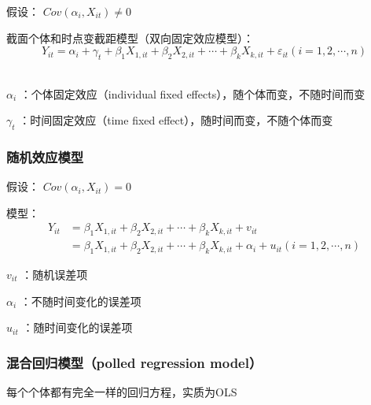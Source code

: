 \documentclass[12pt]{book}
\begin{document}
假设： $Cov(\alpha_i,X_{it})\neq0$

截面个体和时点变截距模型（双向固定效应模型）：
$$Y_{it} =\alpha_i+\gamma_t+\beta_1X_{1,it}+\beta_2X_{2,it}+\cdots+\beta_kX_{k,it}+\varepsilon_{it}\left(i=1,2,\cdots,n\right) $$ \\  
\par $\alpha_i$ ：个体固定效应（individual fixed effects），随个体而变，不随时间而变
\par $\gamma_t$ ：时间固定效应（time fixed effect），随时间而变，不随个体而变


\subsubsection{随机效应模型}
假设： $Cov(\alpha_i,X_{it})=0 $

模型：
\begin{align*} 
    Y_{it} & = \beta_1 X_{1,it}+\beta_2 X_{2,it}+\cdots +\beta_k X_{k,it}+v_{it} \\ & =\beta_1 X_{1,it}+\beta_2 X_{2,it}+\cdots +\beta_k X_{k,it}+\alpha_i+u_{it} (i=1,2,⋯,n) 
\end{align*} 
\par $v_{it}$ ：随机误差项
\par $\alpha_i$ ：不随时间变化的误差项
\par $u_{it}$ ：随时间变化的误差项


\subsubsection{混合回归模型（polled regression model）}
每个个体都有完全一样的回归方程，实质为OLS
\end{document}

